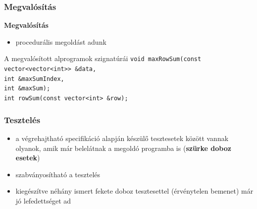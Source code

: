 \documentclass[11pt]{beamer}
\begin{document}
\begin{frame}
	\frametitle{Megvalósítás}
	\textbf{Megvalósítás}
	\begin{itemize}
		\item procedurális megoldást adunk
	\end{itemize}
	\begin{block}{A megvalósított alprogramok szignatúrái}
		\texttt{void maxRowSum(const vector<vector<int>> \&data, \\
			\hspace*{82px}int \&maxSumIndex,\\
			\hspace*{82px}int \&maxSum); \medskip\\
			int rowSum(const vector<int> \&row);}
	\end{block}
\end{frame}


\begin{frame}
	\frametitle{Tesztelés}
	\begin{itemize}
		\item a végrehajtható specifikáció alapján készülő tesztesetek között vannak olyanok, amik már belelátnak a megoldó programba is (\textbf{szürke doboz esetek}) 
		\vspace*{8px}
		\item szabványosítható a tesztelés
		\vspace*{8px}
		\item kiegészítve néhány ismert fekete doboz tesztesettel (érvénytelen bemenet) már jó lefedettséget ad 
	\end{itemize}
\end{frame}
\end{document}
